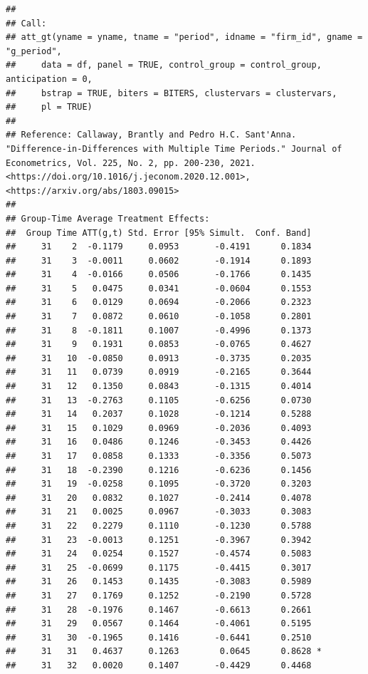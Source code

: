 \documentclass[
]{article}
\begin{document}
\begin{verbatim}
## 
## Call:
## att_gt(yname = yname, tname = "period", idname = "firm_id", gname = "g_period", 
##     data = df, panel = TRUE, control_group = control_group, anticipation = 0, 
##     bstrap = TRUE, biters = BITERS, clustervars = clustervars, 
##     pl = TRUE)
## 
## Reference: Callaway, Brantly and Pedro H.C. Sant'Anna.  "Difference-in-Differences with Multiple Time Periods." Journal of Econometrics, Vol. 225, No. 2, pp. 200-230, 2021. <https://doi.org/10.1016/j.jeconom.2020.12.001>, <https://arxiv.org/abs/1803.09015> 
## 
## Group-Time Average Treatment Effects:
##  Group Time ATT(g,t) Std. Error [95% Simult.  Conf. Band]  
##     31    2  -0.1179     0.0953       -0.4191      0.1834  
##     31    3  -0.0011     0.0602       -0.1914      0.1893  
##     31    4  -0.0166     0.0506       -0.1766      0.1435  
##     31    5   0.0475     0.0341       -0.0604      0.1553  
##     31    6   0.0129     0.0694       -0.2066      0.2323  
##     31    7   0.0872     0.0610       -0.1058      0.2801  
##     31    8  -0.1811     0.1007       -0.4996      0.1373  
##     31    9   0.1931     0.0853       -0.0765      0.4627  
##     31   10  -0.0850     0.0913       -0.3735      0.2035  
##     31   11   0.0739     0.0919       -0.2165      0.3644  
##     31   12   0.1350     0.0843       -0.1315      0.4014  
##     31   13  -0.2763     0.1105       -0.6256      0.0730  
##     31   14   0.2037     0.1028       -0.1214      0.5288  
##     31   15   0.1029     0.0969       -0.2036      0.4093  
##     31   16   0.0486     0.1246       -0.3453      0.4426  
##     31   17   0.0858     0.1333       -0.3356      0.5073  
##     31   18  -0.2390     0.1216       -0.6236      0.1456  
##     31   19  -0.0258     0.1095       -0.3720      0.3203  
##     31   20   0.0832     0.1027       -0.2414      0.4078  
##     31   21   0.0025     0.0967       -0.3033      0.3083  
##     31   22   0.2279     0.1110       -0.1230      0.5788  
##     31   23  -0.0013     0.1251       -0.3967      0.3942  
##     31   24   0.0254     0.1527       -0.4574      0.5083  
##     31   25  -0.0699     0.1175       -0.4415      0.3017  
##     31   26   0.1453     0.1435       -0.3083      0.5989  
##     31   27   0.1769     0.1252       -0.2190      0.5728  
##     31   28  -0.1976     0.1467       -0.6613      0.2661  
##     31   29   0.0567     0.1464       -0.4061      0.5195  
##     31   30  -0.1965     0.1416       -0.6441      0.2510  
##     31   31   0.4637     0.1263        0.0645      0.8628 *
##     31   32   0.0020     0.1407       -0.4429      0.4468  

\end{verbatim}
\end{document}

